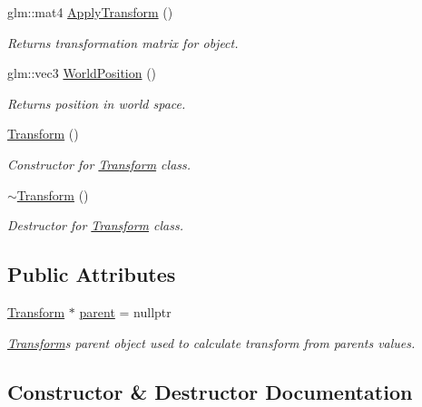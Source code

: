 \begin{DoxyCompactItemize}
glm\+::mat4 \mbox{\hyperlink{class_transform_a550c9c8417c6d288e6352d6cc424a0e9}{Apply\+Transform}} ()
\begin{DoxyCompactList}\small\item\em Returns transformation matrix for object. \end{DoxyCompactList}\item 
glm\+::vec3 \mbox{\hyperlink{class_transform_a631ff0990e3297ed142ce6f5259c2c1a}{World\+Position}} ()
\begin{DoxyCompactList}\small\item\em Returns position in world space. \end{DoxyCompactList}\item 
\mbox{\hyperlink{class_transform_aa08ca4266efabc768973cdeea51945ab}{Transform}} ()
\begin{DoxyCompactList}\small\item\em Constructor for \mbox{\hyperlink{class_transform}{Transform}} class. \end{DoxyCompactList}\item 
\mbox{\hyperlink{class_transform_aa72e286c069850db80927b0e6554cd3e}{$\sim$\+Transform}} ()
\begin{DoxyCompactList}\small\item\em Destructor for \mbox{\hyperlink{class_transform}{Transform}} class. \end{DoxyCompactList}\end{DoxyCompactItemize}
\subsection*{Public Attributes}
\begin{DoxyCompactItemize}
\item 
\mbox{\hyperlink{class_transform}{Transform}} $\ast$ \mbox{\hyperlink{class_transform_aa1e92491c9905869a108ec09a08e5eb4}{parent}} = nullptr
\begin{DoxyCompactList}\small\item\em \mbox{\hyperlink{class_transform}{Transform}}\textquotesingle{}s parent object used to calculate transform from parent\textquotesingle{}s values. \end{DoxyCompactList}\end{DoxyCompactItemize}


\subsection{Constructor \& Destructor Documentation}
\mbox{\label{class_transform_aa08ca4266efabc768973cdeea51945ab}} 
